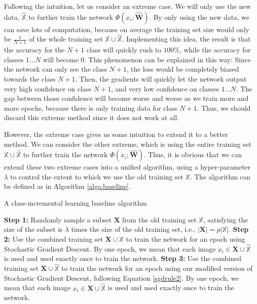 Following the intuition, let us consider an extreme case. We will only use the new data, $\hat{\mathbb{X}}$ to further train the network $\Phi(x_i; \hat{\mathbf{W}})$. By only using the new data, we can save lots of computation, because on average the training set size would only be $\frac{1}{N+1}$ of the whole training set $\mathbb{X}\cup \hat{\mathbb{X}}$. Implementing this idea, the result is that the accuracy for the $N+1$ class will quickly rush to $100\%$, while the accuracy for classes $1...N$ will become $0$. This phenomenon can be explained in this way: Since the network can only see the class $N+1$, the loss would be completely biased towards the class $N+1$. Then, the gradients will quickly let the network output very high confidence on class $N+1$, and very low confidence on classes $1...N$. The gap between those confidence will become worse and worse as we train more and more epochs, because there is only training data for class $N+1$. Thus, we should discard this extreme method since it does not work at all.

However, the extreme case gives us some intuition to extend it to a better method. We can consider the other extreme, which is using the entire training set $\mathbb{X}\cup \hat{\mathbb{X}}$ to further train the network $\Phi(x_i; \hat{\mathbf{W}})$. Thus, it is obvious that we can extend these two extreme cases into a unified algorithm, using a hyper-parameter $\lambda$ to control the extent to which we use the old training set $\mathbb{X}$. The algorithm can be defined as in Algorithm \ref{algo:baseline}.


\begin{algorithm}
	\caption{A class-incremental learning baseline algorithm}
	\label{algo:baseline}
	\begin{algorithmic}
		\State \textbf{Step 1:} Randomly sample a subset $\mathbf{X}$ from the old training set $\mathbb{X}$, satisfying the size of the subset is $\lambda$ times the size of the old training set, i.e., $|\mathbf{X}| = p|\mathbb{X}|$.
		\State \textbf{Step 2:} Use the combined training set $\mathbf{X} \cup \hat{\mathbb{X}}$ to train the network for an epoch using Stochastic Gradient Descent. By one epoch, we mean that each image $x_i \in \mathbf{X} \cup \hat{\mathbb{X}}$ is used and used exactly once to train the network.
		\State \textbf{Step 3:} Use the combined training set $\mathbf{X} \cup \hat{\mathbb{X}}$ to train the network for an epoch using our modified version of Stochastic Gradient Descent, following Equation \ref{sgdrule2}. By one epoch, we mean that each image $x_i \in \mathbf{X} \cup \hat{\mathbb{X}}$ is used and used exactly once to train the network.
		\EndFor
	\end{algorithmic}
\end{algorithm}

